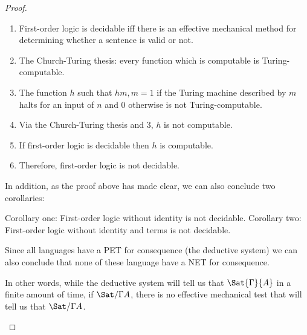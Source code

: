 \documentclass[../../include/open-logic-section]{subfiles}
\begin{document}
\begin{proof}
\begin{enumerate}
\begin{enumerate}
\item First-order logic is decidable iff there is an effective mechanical
method for determining whether a sentence is valid or not.
\item The Church-Turing thesis: every function which is computable is
Turing-computable.
\item The function $h$ such that $h{m,m} = 1$ if the Turing machine
described by $m$ halts for an input of $n$ and $0$ otherwise is not
Turing-computable.
\item Via the Church-Turing thesis and 3, $h$ is not computable.
\item If first-order logic is decidable then $h$ is computable.
\item Therefore, first-order logic is not decidable.
\end{enumerate}
In addition, as the proof above has made clear, we can also conclude two
corollaries:

Corollary one: First-order logic without identity is not decidable.
Corollary two: First-order logic without identity and terms is not
decidable.

Since all languages have a PET for consequence (the deductive system) we
can also conclude that none of these language have a NET for consequence.

In other words, while the deductive system will tell us that
$\Sat{\Gamma}{A}$ in a finite amount of time, if $\Sat/{\Gamma}{A}$, there
is no effective mechanical test that will tell us that $\Sat/{\Gamma}{A}$.

\end{enumerate}
\end{proof}
\end{document}
